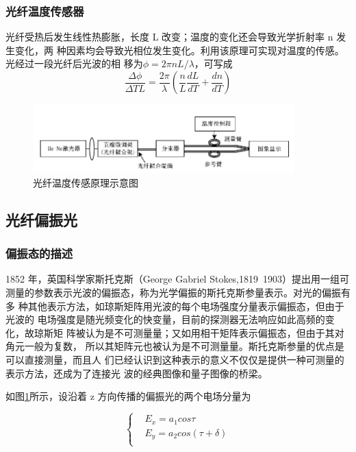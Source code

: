 \documentclass[10pt,a4paper,twoside,UTF8]{ctexart}
\begin{document}
\subsubsection{光纤温度传感器}
光纤受热后发生线性热膨胀，长度 L 改变；温度的变化还会导致光学折射率 n 发生变化，两
种因素均会导致光相位发生变化。利用该原理可实现对温度的传感。光经过一段光纤后光波的相
移为$\phi = 2\pi nL/\lambda$，可写成
\begin{equation}
	\frac{\varDelta \phi}{\varDelta T L}=\frac{2\pi}{\lambda}\left(\frac{n}{L}\frac{dL}{dT}+\frac{dn}{dT}\right)
\end{equation}

\begin{figure}[H]
	\centering
	\includegraphics[width=0.9\textwidth]{img//11.png}
	\caption{光纤温度传感原理示意图}
	\label{fig:11}
\end{figure}

\subsection{光纤偏振光}
\subsubsection{偏振态的描述}
1852 年，英国科学家斯托克斯（George Gabriel Stokes,1819~1903）提出用一组可
测量的参数表示光波的偏振态，称为光学偏振的斯托克斯参量表示。对光的偏振有多
种其他表示方法，如琼斯矩阵用光波的每个电场强度分量表示偏振态，但由于光波的
电场强度是随光频变化的快变量，目前的探测器无法响应如此高频的变化，故琼斯矩
阵被认为是不可测量量；又如用相干矩阵表示偏振态，但由于其对角元一般为复数，
所以其矩阵元也被认为是不可测量量。斯托克斯参量的优点是可以直接测量，而且人
们已经认识到这种表示的意义不仅仅是提供一种可测量的表示方法，还成为了连接光
波的经典图像和量子图像的桥梁。

如图\ref{fig:11}所示，设沿着 z 方向传播的偏振光的两个电场分量为

\[\left\{
\begin{aligned}
&E_x= a_1 cos\tau \\
&E_y= a_2 cos(\tau+\delta) \\
\end{aligned}
\right.
\]
\end{document}
